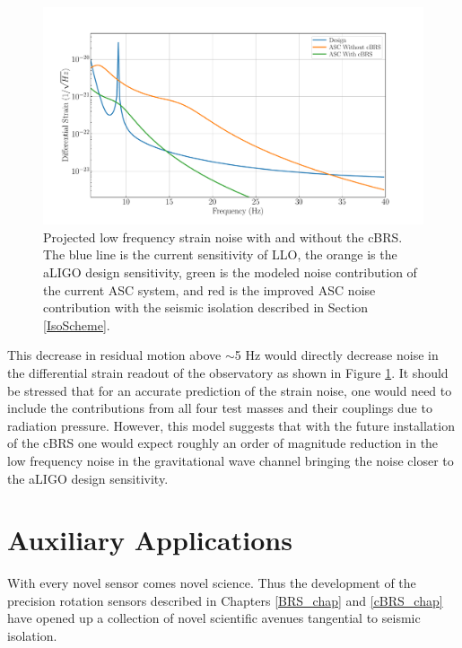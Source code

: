 \documentclass [12pt, proquest]{uwthesis}[2019]
\begin{document}
\begin{figure}[!h]
\begin{center}
\includegraphics[width=\textwidth]{cBRS_ASC.pdf}
\caption[Projected low frequency strain noise with and without the cBRS]{Projected low frequency strain noise with and without the cBRS. The blue line is the current sensitivity of LLO, the orange is the aLIGO design sensitivity, green is the modeled noise contribution of the current ASC system, and red is the improved ASC noise contribution with the seismic isolation described in Section \ref{IsoScheme}. }
\label{ascStrain}
\end{center}
\end{figure}

This decrease in residual motion above $\sim$5 Hz would directly decrease noise in the differential strain readout of the observatory as shown in Figure \ref{ascStrain}. It should be stressed that for an accurate prediction of the strain noise, one would need to include the contributions from all four test masses and their couplings due to radiation pressure. However, this model suggests that with the future installation of the cBRS one would expect roughly an order of magnitude reduction in the low frequency noise in the gravitational wave channel bringing the noise closer to the aLIGO design sensitivity.


\chapter{Auxiliary Applications}
\quad With every novel sensor comes novel science. Thus the development of the precision rotation sensors described in Chapters \ref{BRS_chap} and \ref{cBRS_chap} have opened up a collection of novel scientific avenues tangential to seismic isolation.
\end{document}
